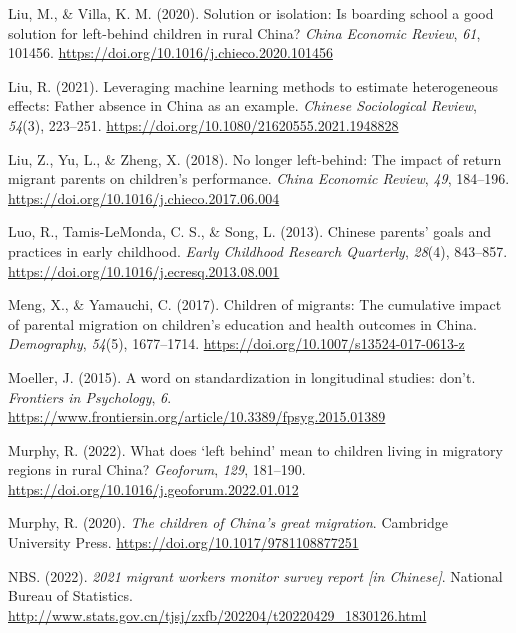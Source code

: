 \documentclass[
  man,floatsintext]{apa7}
\newlength{\cslhangindent}
\newlength{\cslentryspacingunit} %
\newenvironment{CSLReferences}[2] %
 {%
  \setlength{\parindent}{0pt}
  \ifodd #1
  \let\oldpar\par
  \def\par{\hangindent=\cslhangindent\oldpar}
  \fi
  \setlength{\parskip}{#2\cslentryspacingunit}
 }%
 {}
\begin{document}
\begin{CSLReferences}{1}{0}
\leavevmode{}%
Liu, M., \& Villa, K. M. (2020). Solution or isolation: Is boarding school a good solution for left-behind children in rural {China}? \emph{{China} Economic Review}, \emph{61}, 101456. \url{https://doi.org/10.1016/j.chieco.2020.101456}

\leavevmode{}%
Liu, R. (2021). Leveraging machine learning methods to estimate heterogeneous effects: Father absence in {China} as an example. \emph{Chinese Sociological Review}, \emph{54}(3), 223--251. \url{https://doi.org/10.1080/21620555.2021.1948828}

\leavevmode{}%
Liu, Z., Yu, L., \& Zheng, X. (2018). No longer left-behind: The impact of return migrant parents on children's performance. \emph{{China} Economic Review}, \emph{49}, 184--196. \url{https://doi.org/10.1016/j.chieco.2017.06.004}

\leavevmode{}%
Luo, R., Tamis-LeMonda, C. S., \& Song, L. (2013). Chinese parents{'} goals and practices in early childhood. \emph{Early Childhood Research Quarterly}, \emph{28}(4), 843--857. \url{https://doi.org/10.1016/j.ecresq.2013.08.001}

\leavevmode{}%
Meng, X., \& Yamauchi, C. (2017). Children of migrants: The cumulative impact of parental migration on children{'}s education and health outcomes in {China}. \emph{Demography}, \emph{54}(5), 1677--1714. \url{https://doi.org/10.1007/s13524-017-0613-z}

\leavevmode{}%
Moeller, J. (2015). A word on standardization in longitudinal studies: don't. \emph{Frontiers in Psychology}, \emph{6}. \url{https://www.frontiersin.org/article/10.3389/fpsyg.2015.01389}

\leavevmode{}%
Murphy, R. (2022). What does {`}left behind{'} mean to children living in migratory regions in rural {China}? \emph{Geoforum}, \emph{129}, 181--190. \url{https://doi.org/10.1016/j.geoforum.2022.01.012}

\leavevmode{}%
Murphy, R. (2020). \emph{The children of {China}{'}s great migration}. Cambridge University Press. \url{https://doi.org/10.1017/9781108877251}

\leavevmode{}%
NBS. (2022). \emph{2021 migrant workers monitor survey report {[}in {Chinese}{]}}. National Bureau of Statistics. \url{http://www.stats.gov.cn/tjsj/zxfb/202204/t20220429_1830126.html}


\end{CSLReferences}
\end{document}
